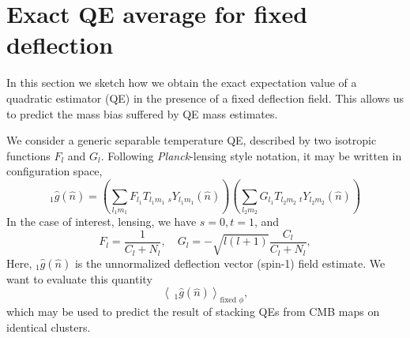 \documentclass[prd, superscriptaddress, tightenlines, longbibliography, nofootinbib, eqsecnum, amsfonts, amsmath, floatfix, twocolumn, notitlepage]{revtex4-2}
\newcommand{\av}[1]{\left \langle #1\right\rangle}
\begin{document}


\section{Exact QE average for fixed deflection}\label{A1}
\newcommand{\hn}[0]{\hat n}
In this section we sketch how we obtain the exact expectation value of a quadratic estimator (QE) in the presence of a fixed deflection field. This allows us to predict the mass bias suffered by QE mass estimates.

We consider a generic separable temperature QE, described by two isotropic functions $F_l$ and $G_l$. Following \emph{Planck}-lensing style notation, it may be written in configuration space,
\begin{equation}
	_{1}\hat g(\hat n) = \left( \sum_{l_1m_1} F_{l_1} T_{l_1m_1}\:_sY_{l_1m_1}(\hn) \right) \left( \sum_{l_2m_2} G_{l_1} T_{l_2m_2}\:_tY_{l_2m_2}(\hn) \right) 
\end{equation}
In the case of interest, lensing, we have $s =0, t = 1$, and
\begin{equation}
	F_l = \frac{1}{C_l + N_l}, \quad G_l = - \sqrt{l(l+ 1)}\frac{C_l}{C_l + N_l},
\end{equation}
Here, $_{1} \hat g(\hat n)$ is the unnormalized deflection vector (spin-1) field estimate. We want to evaluate this quantity
\begin{equation} \label{eq:avg}
	\av{\: _{1}\hat g(\hat n)}_{\text{fixed $\phi$}},
\end{equation}
which may be used to predict the result of stacking QEs from CMB maps on identical clusters.
\end{document}
